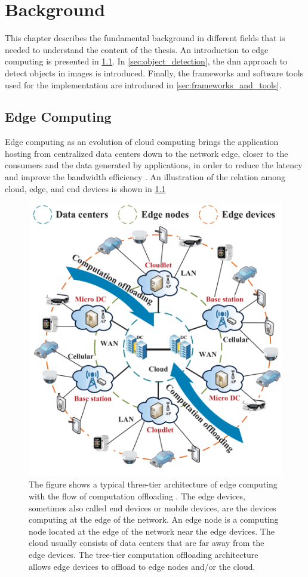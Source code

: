 \chapter{Background}\label{ch:background}

This chapter describes the fundamental background in different fields that is needed to understand the content of the thesis. An introduction to edge computing is presented in \cref{sec:edge_computing}. In \cref{sec:object_detection}, the \gls{dnn} approach to detect objects in images is introduced. Finally, the frameworks and software tools used for the implementation are introduced in \cref{sec:frameworks_and_tools}.

\section{Edge Computing}\label{sec:edge_computing}

Edge computing as an evolution of cloud computing brings the application hosting from centralized data centers down to the network edge, closer to the consumers and the data generated by applications, in order to reduce the latency and improve the bandwidth efficiency \cite{Kekki2018}. An illustration of the relation among cloud, edge, and end devices is shown in \cref{fig:mec}

\begin{figure}
    \centering
    \includegraphics[width=0.6\linewidth]{figures/background/mec.png}
    \caption[A typical three-tier architecture of edge computing with the flow of computation offloading]{The figure shows a typical three-tier architecture of edge computing with the flow of computation offloading \cite{Lin2019}. The edge devices, sometimes also called end devices or mobile devices, are the devices computing at the edge of the network. An edge node is a computing node located at the edge of the network near the edge devices. The cloud usually consists of data centers that are far away from the edge devices. The tree-tier computation offloading architecture allows edge devices to offload to edge nodes and/or the cloud.}
    \label{fig:mec}
\end{figure}

